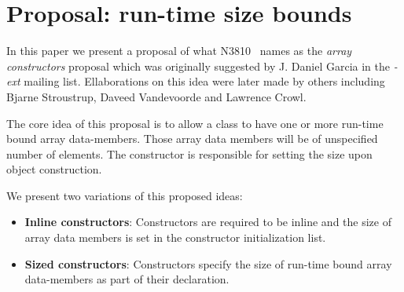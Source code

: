\section{Proposal: run-time size bounds}

In this paper we present a proposal of what N3810~\cite{n3810} names as the
\emph{array constructors} proposal which was originally suggested by J. Daniel
Garcia in the \emph{-ext} mailing list. Ellaborations on this idea were later
made by others including Bjarne Stroustrup, Daveed Vandevoorde and Lawrence
Crowl.

The core idea of this proposal is to allow a class to have one or more run-time
bound array data-members. Those array data members will be of unspecified number
of elements. The constructor is responsible for setting the size upon object
construction.

We present two variations of this proposed ideas:

\begin{itemize}

\item \textbf{Inline constructors}: Constructors are required to be inline and the size
of array data members is set in the constructor initialization list.

\item \textbf{Sized constructors}: Constructors specify the size of run-time
bound array data-members as part of their declaration.

\end{itemize}



